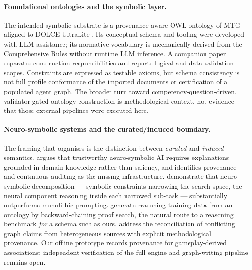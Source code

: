 \documentclass[11pt,a4paper]{article}
\theoremstyle{definition}
\theoremstyle{plain}
\begin{document}
\paragraph{Foundational ontologies and the symbolic layer.} The intended symbolic substrate is a provenance-aware OWL ontology of MTG aligned to DOLCE-UltraLite \citep{gangemi2002dolce, borgo2022dolce}. Its conceptual schema and tooling were developed with LLM assistance; its normative vocabulary is mechanically derived from the Comprehensive Rules without runtime LLM inference. A companion paper \citep{neuburger2026ontology} separates construction responsibilities and reports logical and data-validation scopes. Constraints are expressed as testable axioms, but schema consistency is not full profile conformance of the imported documents or certification of a populated agent graph. The broader turn toward competency-question-driven, validator-gated ontology construction \citep{garijo2026maseo, cq4oe2026, lippolis2026ontoextend, tiwari2026ontoprompt} is methodological context, not evidence that those external pipelines were executed here.

\paragraph{Neuro-symbolic systems and the curated/induced boundary.} The framing that organises  is the distinction between \emph{curated} and \emph{induced} semantics. \citet{sabou2026neurosymbolic} argues that trustworthy neuro-symbolic AI requires explanations grounded in domain knowledge rather than saliency, and identifies provenance and continuous auditing as the missing infrastructure. \citet{thombre2026selfdemo} demonstrate that neuro-symbolic decomposition --- symbolic constraints narrowing the search space, the neural component reasoning inside each narrowed sub-task --- substantially outperforms monolithic prompting. \citet{vanschependom2026synthology} generate reasoning training data from an ontology by backward-chaining proof search, the natural route to a reasoning benchmark \emph{for} a schema such as ours. \citet{ehrenmuller2026sock} address the reconciliation of conflicting graph claims from heterogeneous sources with explicit methodological provenance. Our offline prototype records provenance for gameplay-derived associations; independent verification of the full engine and graph-writing pipeline remains open.
\end{document}
